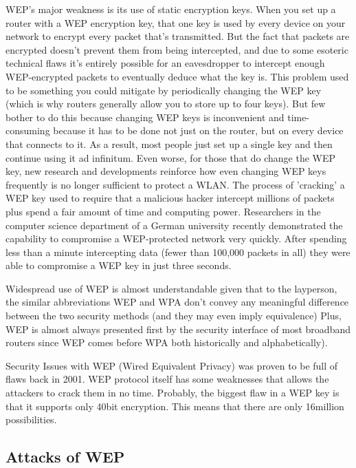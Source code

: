 \documentclass[a4paper,12pt,pagesize,headsepline,bibtotoc,titlepage]{scrartcl}
\begin{document}
WEP's major weakness is its use of static encryption keys. When you set up a router with a WEP encryption key, that one key is used by every device on your network to encrypt every packet that's transmitted. But the fact that packets are encrypted doesn't prevent them from being intercepted, and due to some esoteric technical flaws it's entirely possible for an eavesdropper to intercept enough WEP-encrypted packets to eventually deduce what the key is.
This problem used to be something you could mitigate by periodically changing the WEP key (which is why routers generally allow you to store up to four keys). But few bother to do this because changing WEP keys is inconvenient and time-consuming because it has to be done not just on the router, but on every device that connects to it. As a result, most people just set up a single key and then continue using it ad infinitum.
Even worse, for those that do change the WEP key, new research and developments reinforce how even changing WEP keys frequently is no longer sufficient to protect a WLAN. The process of 'cracking' a WEP key used to require that a malicious hacker intercept millions of packets plus spend a fair amount of time and computing power. Researchers in the computer science department of a German university recently demonstrated the capability to compromise a WEP-protected network very quickly. After spending less than a minute intercepting data (fewer than 100,000 packets in all) they were able to compromise a WEP key in just three seconds.

Widespread use of WEP is almost understandable given that to the layperson, the similar abbreviations WEP and WPA don't convey any meaningful difference between the two security methods (and they may even imply equivalence) Plus, WEP is almost always presented first by the security interface of most broadband routers since WEP comes before WPA both historically and alphabetically).

Security Issues with WEP (Wired Equivalent Privacy) was proven to be full of flaws back in 2001. WEP protocol itself has some weaknesses that allows the attackers to crack them in no time. Probably, the biggest flaw in a WEP key is that it supports only 40bit encryption. This means that there are only 16million possibilities. 

\subsection{Attacks of WEP}
\end{document}
